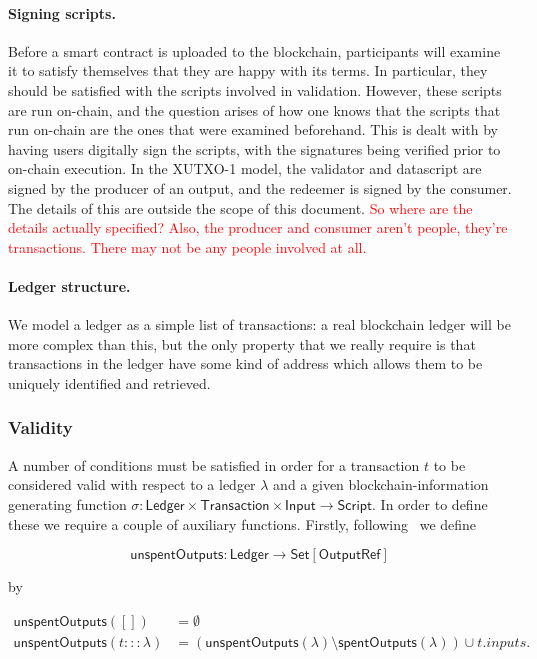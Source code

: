 \documentclass[a4paper]{article}
\newcommand{\red}[1]{\textcolor{red}{#1}}
\newcommand{\s}{\textsf}  %
\theoremstyle{definition}  %
\newcommand{\Set}[1]{\ensuremath{\s{Set}[#1]}}
\newcommand{\mi}[1]{\ensuremath{\mathit{#1}}}
\newcommand{\inputs}{\mi{inputs}}
\newcommand{\msf}[1]{\ensuremath{\mathsf{#1}}}
\newcommand{\spent}{\msf{spentOutputs}}
\newcommand{\unspent}{\msf{unspentOutputs}}
\begin{document}
\paragraph{Signing scripts.}  Before a smart contract is uploaded to
the blockchain, participants will examine it to satisfy themselves
that they are happy with its terms.  In particular, they should be
satisfied with the scripts involved in validation.  However, these
scripts are run on-chain, and the question arises of how one knows
that the scripts that run on-chain are the ones that were examined
beforehand.  This is dealt with by having users digitally sign the
scripts, with the signatures being verified prior to on-chain
execution.  In the XUTXO-1 model, the validator and datascript are
signed by the producer of an output, and the redeemer is signed by the
consumer.  The details of this are outside the scope of this document.
\red{So where are the details actually specified? Also, the producer and
  consumer aren't people, they're transactions.  There may not be any
  people involved at all.}

\paragraph{Ledger structure.} We model a ledger as a simple
list of transactions: a real blockchain ledger will be more complex
than this, but the only property that we really require is that
transactions in the ledger have some kind of address which allows them
to be uniquely identified and retrieved.

\subsubsection{Validity}
\label{sec:xutxo-1-validity}
A number of conditions must be satisfied in order for a transaction
$t$ to be considered valid with respect to a ledger $\lambda$ and a
given blockchain-information generating function $\sigma :
\mathsf{Ledger} \times \mathsf{Transaction} \times \mathsf{Input}
\rightarrow \mathsf{Script}$.  In order to define these we require a
couple of auxiliary functions.  Firstly,
following~\cite{Zahnentferner18-UTxO} we define

\[
  \unspent : \mathsf{Ledger} \rightarrow \Set{\s{OutputRef}}
\]

\noindent by

\begin{align*}
   \unspent([]) &=\emptyset \\
   \unspent(t:::\lambda) &= (\unspent(\lambda) \setminus \spent(\lambda)) \cup t.\inputs.
\end{align*}
\end{document}
